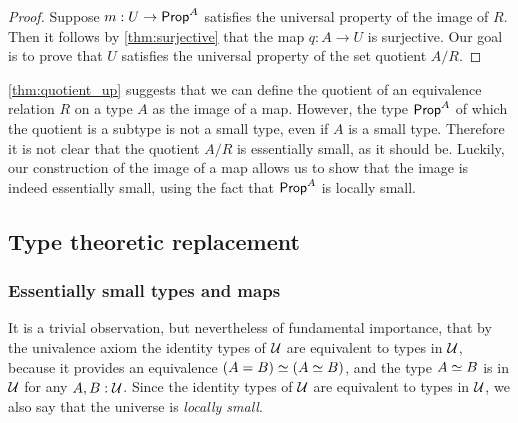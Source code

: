 \begin{proof}
Suppose $m:U\to \mathsf{Prop}^A$ satisfies the universal property of the image of $R$. Then it follows by \cref{thm:surjective} that the map $q:A\to U$ is surjective. Our goal is to prove that $U$ satisfies the universal property of the set quotient $A/R$. 
\end{proof}

\begin{rmk}
\cref{thm:quotient_up} suggests that we can define the quotient of an equivalence relation $R$ on a type $A$ as the image of a map. However, the type $\mathsf{Prop}^A$ of which the quotient is a subtype is not a small type, even if $A$ is a small type.
Therefore it is not clear that the quotient $A/R$ is essentially small, as it should be. Luckily, our construction of the image of a map allows us to show that the image is indeed essentially small, using the fact that $\mathsf{Prop}^A$ is locally small.
\end{rmk}

\subsection{Type theoretic replacement}
\subsubsection{Essentially small types and maps}
It is a trivial observation, but nevertheless of fundamental importance, that by the univalence axiom the identity types of $\mathcal{U}$ are equivalent to types in $\mathcal{U}$, because it provides an equivalence $\eqv{(A=B)}{(\eqv{A}{B})}$, and the type $\eqv{A}{B}$ is in $\mathcal{U}$ for any $A,B:\mathcal{U}$. Since the identity types of $\mathcal{U}$ are equivalent to types in $\mathcal{U}$, we also say that the universe is \emph{locally small}.

